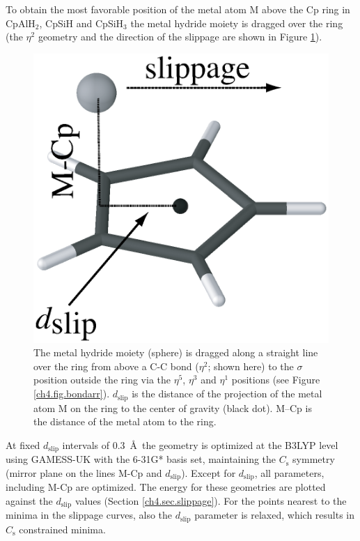 To obtain the most favorable position of the metal atom M above the Cp ring in CpAlH$_2$, CpSiH and CpSiH$_3$ the metal hydride moiety is dragged over the ring (the $\eta^2$ geometry and the direction of the slippage are shown in Figure \ref{ch4.fig.slip}).
\begin{figure}[hbtp]
\center
\includegraphics[scale=0.3]{cyclopentadienyl/figures/verloop.eps}
\caption{The metal hydride moiety (sphere) is dragged along a straight line over the ring from above a C-C bond ($\eta^2$; shown here) to the $\sigma$ position outside the ring via the $\eta^5$, $\eta^3$ and $\eta^1$ positions (see Figure \ref{ch4.fig.bondarr}).  $d_\mathrm{slip}$ is the distance of the projection of the metal atom M on the ring to the center of gravity (black dot). M--Cp is the distance of the metal atom to the ring.}
\label{ch4.fig.slip}
\end{figure}
At fixed $d_\mathrm{slip}$ intervals of 0.3~\AA\  the geometry is optimized at the B3LYP level \cite{b3,lyp} using GAMESS-UK \cite{gamess} with the \mbox{6-31G*} basis set, maintaining the $C_\mathrm{s}$ symmetry (mirror plane on the lines M-Cp and $d_\mathrm{slip}$). Except for $d_\mathrm{slip}$, all parameters, including M-Cp are optimized. The energy for these geometries are plotted against the $d_\mathrm{slip}$ values (Section \ref{ch4.sec.slippage}). For the points nearest to the minima in the slippage curves, also the $d_\mathrm{slip}$ parameter is relaxed, which results in $C_\mathrm{s}$ constrained minima.

